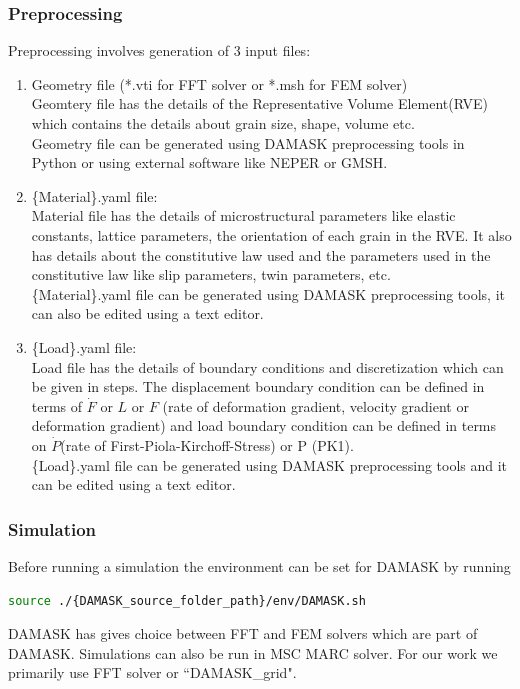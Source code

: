 \subsubsection{Preprocessing}
Preprocessing involves generation of 3 input files:
\begin{enumerate}
\item Geometry file (*.vti for FFT solver or *.msh for FEM solver) \\ Geomtery file has the details of the Representative Volume Element(RVE) which contains the details about grain size, shape, volume etc.\\
Geometry file can be generated using DAMASK preprocessing tools in Python or using external software like NEPER or GMSH.
\item \{Material\}.yaml file: \\ Material file has the details of microstructural parameters like elastic constants, lattice parameters, the orientation of each grain in the RVE. It also has details about the constitutive law used and the parameters used in the constitutive law like slip parameters, twin parameters, etc. \\
\{Material\}.yaml file can be generated using DAMASK preprocessing tools, it can also be edited using a text editor.
\item \{Load\}.yaml file: \\ Load file has the details of boundary conditions and discretization which can be given in steps.
The displacement boundary condition can be defined in terms of $\Dot{F}$ or $L$ or $F$ (rate of deformation gradient, velocity gradient or deformation gradient) and load boundary condition can be defined in terms on $\Dot{P}$(rate of First-Piola-Kirchoff-Stress) or P (PK1).\\
\{Load\}.yaml file can be generated using DAMASK preprocessing tools and it can be edited using a text editor.
\end{enumerate}

\subsubsection{Simulation}
Before running a simulation the environment can be set for DAMASK by running 
\begin{lstlisting}[language=bash, basicstyle=\small\ttfamily, frame=single]
source ./{DAMASK_source_folder_path}/env/DAMASK.sh
\end{lstlisting}

DAMASK has gives choice between FFT and FEM solvers which are part of DAMASK. Simulations can also be run in MSC MARC solver. For our work we primarily use FFT solver or ``DAMASK\_grid".

